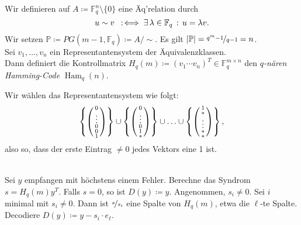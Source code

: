 \documentclass{cheat-sheet}
\newcommand{\F}{\mathbb{F}} %
\DeclareMathOperator{\Ham}{Ham} %
\newcommand{\Proj}{\mathbb{P}} %
\begin{document}
\begin{konstr}
  Wir definieren auf $A \coloneqq \F_q^n \setminus \{ 0 \}$ eine Äq'relation durch
  \[ u \sim v \coloniff \ex{\lambda \in \F_q} u = \lambda v. \]
  Wir setzen $\Proj \coloneqq PG(m-1, \F_q) \coloneqq A/{\sim}$.
  Es gilt $\abs{\Proj} = \nicefrac{q^m - 1}{q - 1} = n$. \\
  Sei $v_1, \ldots, v_n$ ein Representantensystem der Äquivalenzklassen. \\
  Dann definiert die Kontrollmatrix $H_q(m) \coloneqq (v_1 \cdots v_n)^T \in \F_q^{m \times n}$ den \emph{$q$-nären Hamming-Code} $\Ham_q(n)$.
\end{konstr}

\begin{bem}
  Wir wählen das Representantensystem wie folgt:
  \[
    \left\{ \begin{psmallmatrix} 0 \\ \vdots \\ 0 \\ 0 \\ 1 \end{psmallmatrix} \right\} \cup
    \left\{ \begin{psmallmatrix} 0 \\ \vdots \\ 0 \\ 1 \\ * \end{psmallmatrix} \right\} \cup \ldots \cup
    \left\{ \begin{psmallmatrix} 1 \\ * \\ \vdots \\ * \\ * \end{psmallmatrix} \right\},
  \]
  also so, dass der erste Eintrag $\neq 0$ jedes Vektors eine 1 ist.
\end{bem}

\begin{alg} \mbox{} \\
  Sei $y$ empfangen mit höchstens einem Fehler.
  Berechne das Syndrom $s = H_q(m)y^T$.
  Falls $s = 0$, so ist $D(y) \coloneqq y$.
  Angenommen, $s_i \neq 0$.
  Sei $i$ minimal mit $s_i \neq 0$.
  Dann ist $\nicefrac{s}{s_i}$ eine Spalte von $H_q(m)$, etwa die $\ell$-te Spalte.
  Decodiere $D(y) \coloneqq y - s_i \cdot e_\ell$.
\end{alg}
\end{document}

